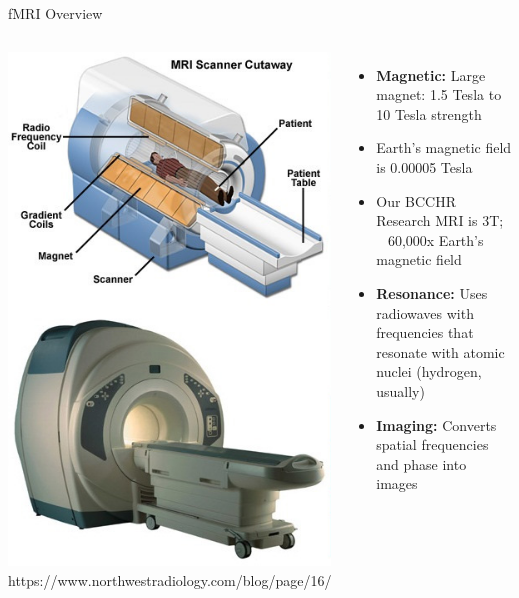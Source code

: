 \documentclass[aspectratio=169,xcolor=dvipsnames]{beamer}
\begin{document}
\begin{frame}{fMRI Overview}
\begin{columns}[c]
\includegraphics[width=1\textwidth]{imgs/MRI}
\tiny{https://www.northwestradiology.com/blog/page/16/}
\begin{itemize}
\item \textbf{Magnetic:} Large magnet: 1.5 Tesla to 10 Tesla strength
\item Earth's magnetic field is 0.00005 Tesla
\item Our BCCHR Research MRI is 3T; ~ 60,000x Earth's magnetic field
\item \textbf{Resonance:} Uses radiowaves with frequencies that resonate with atomic nuclei (hydrogen, usually)
\item \textbf{Imaging:} Converts spatial frequencies and phase into images
\end{itemize}
\end{columns}
\end{frame}
\end{document}
